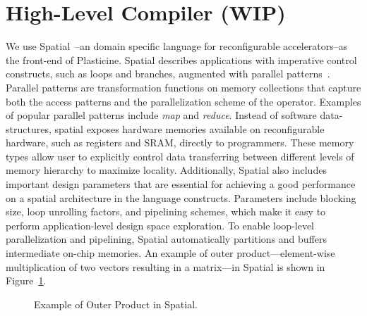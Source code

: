 \section{High-Level Compiler (WIP)} 

We use Spatial~\cite{spatial_koeplinger}--an domain specific language for reconfigurable
accelerators--as the front-end of Plasticine.
Spatial describes applications with imperative control constructs, such as loops and branches,
augmented with parallel patterns~\cite{parallelpattern}.
Parallel patterns are transformation functions on memory collections that capture both the access
patterns and the parallelization scheme of the operator.
Examples of popular parallel patterns include \emph{map} and \emph{reduce}.
Instead of software data-structures, spatial exposes hardware memories available on reconfigurable
hardware, such as registers and SRAM, directly to programmers.
These memory types allow user to explicitly control data transferring between different levels of
memory hierarchy to maximize locality.
Additionally, Spatial also includes important design parameters 
that are essential for achieving a good performance on a spatial architecture in the language
constructs.
Parameters include blocking size, loop unrolling factors, and pipelining schemes, which make it
easy to perform application-level design space exploration.
To enable loop-level parallelization and pipelining, Spatial automatically partitions and buffers 
intermediate on-chip memories.
An example of outer product---element-wise multiplication of two vectors resulting in a matrix---in Spatial is shown in Figure~\ref{fig:spatial_app}.

\begin{figure}
\centering
  \begin{minipage}{0.6\textwidth}

  \end{minipage}
  \caption{Example of Outer Product in Spatial.}
\label{fig:spatial_app}
\end{figure}

